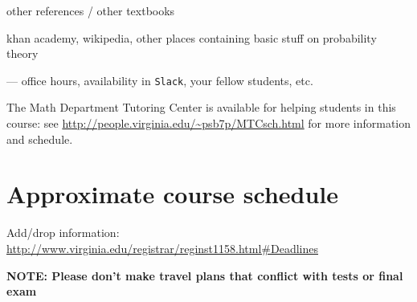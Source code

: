 \documentclass[oneside,11pt]{amsart}
\begin{document}


other references / other textbooks

khan academy, wikipedia, other places containing basic stuff on probability theory

--- office hours, availability in \texttt{Slack}, 
your fellow students, etc.

The Math Department Tutoring Center is available for helping students in this course: 
see \url{http://people.virginia.edu/~psb7p/MTCsch.html}
for more information and schedule. 

\section{Approximate course schedule}

\noindent Add/drop information: \url{http://www.virginia.edu/registrar/reginst1158.html#Deadlines}
\smallskip

\noindent \textbf{NOTE: Please don't make travel plans that conflict with tests or final exam}
\smallskip
\end{document}
